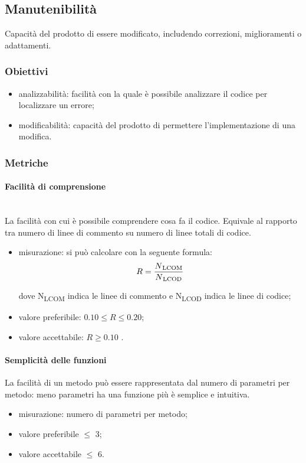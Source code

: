 	\subsection{Manutenibilità}
	Capacità del prodotto di essere modificato, includendo correzioni, miglioramenti o adattamenti.
		\subsubsection{Obiettivi}
		\begin{itemize}
			\item analizzabilità: facilità con la quale è possibile analizzare il codice per localizzare un errore;
			\item modificabilità: capacità del prodotto di permettere l'implementazione di una modifica.
		\end{itemize}
		\subsubsection{Metriche}
			\paragraph{Facilità di comprensione}\mbox{}\\
			La facilità con cui è possibile comprendere cosa fa il codice. Equivale al rapporto tra numero di linee di commento su numero di linee totali di codice. %
			\begin{itemize}
			\item misurazione: si può calcolare con la seguente formula: \\
			$$ R = \frac{N\textsubscript{LCOM}}{N\textsubscript{LCOD}}  $$
		
			dove N\textsubscript{LCOM} indica le linee di commento e N\textsubscript{LCOD} indica le linee di codice;
			\item valore preferibile: $0.10 \leq R \leq 0.20$;
			\item valore accettabile: $R \geq 0.10$ .
			\end{itemize}
			\paragraph{Semplicità delle funzioni}
			La facilità di un metodo può essere rappresentata dal numero di parametri per metodo: meno parametri ha una funzione più è semplice e intuitiva.
			\begin{itemize}
			\item misurazione: numero di parametri per metodo;
			\item valore preferibile $\leq$ 3;
			\item valore accettabile $\leq$ 6.
			\end{itemize}
